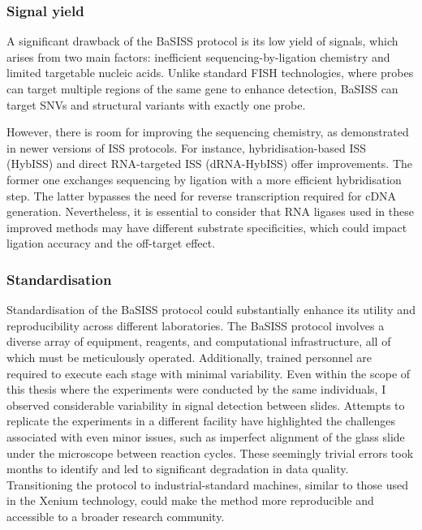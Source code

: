 \subsubsection*{Signal yield}

A significant drawback of the \ac{BaSISS} protocol is its low yield of signals, which arises from two main factors: inefficient sequencing-by-ligation chemistry and limited targetable nucleic acids. Unlike standard FISH technologies, where probes can target multiple regions of the same gene to enhance detection, \ac{BaSISS} can target \acp{SNV} and structural variants with exactly one probe.

However, there is room for improving the sequencing chemistry, as demonstrated in newer versions of \ac{ISS} protocols. For instance, hybridisation-based \ac{ISS} (HybISS) \parencite{Gyllborg2020-uq} and direct RNA-targeted \ac{ISS} (dRNA-HybISS) \parencite{Lee2022-ha} offer improvements. The former one exchanges sequencing by ligation with a more efficient hybridisation step. The latter bypasses the need for reverse transcription required for cDNA generation. Nevertheless, it is essential to consider that RNA ligases used in these improved methods may have different substrate specificities, which could impact ligation accuracy and the off-target effect.

\subsubsection*{Standardisation}

Standardisation of the \ac{BaSISS} protocol could substantially enhance its utility and reproducibility across different laboratories. The \ac{BaSISS} protocol involves a diverse array of equipment, reagents, and computational infrastructure, all of which must be meticulously operated. Additionally, trained personnel are required to execute each stage with minimal variability. Even within the scope of this thesis where the experiments were conducted by the same individuals, I observed considerable variability in signal detection between slides. Attempts to replicate the experiments in a different facility have highlighted the challenges associated with even minor issues, such as imperfect alignment of the glass slide under the microscope between reaction cycles. These seemingly trivial errors took months to identify and led to significant degradation in data quality. Transitioning the protocol to industrial-standard machines, similar to those used in the \ac{Xenium} technology, could make the method more reproducible and accessible to a broader research community.

